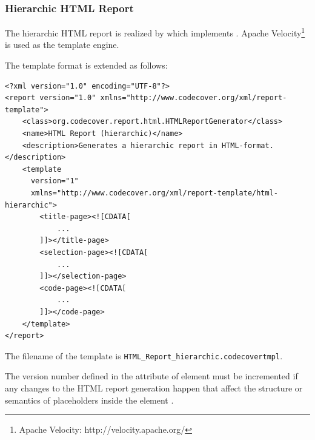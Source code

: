 \subsubsection{Hierarchic HTML Report} \label{Classes:Report:HTMLReport}

The hierarchic HTML report is realized by  which implements . Apache Velocity\footnote{Apache Velocity: http://velocity.apache.org/} is used as the template engine.

The template format is extended as follows:
\begin{verbatim}
<?xml version="1.0" encoding="UTF-8"?>
<report version="1.0" xmlns="http://www.codecover.org/xml/report-template">
    <class>org.codecover.report.html.HTMLReportGenerator</class>
    <name>HTML Report (hierarchic)</name>
    <description>Generates a hierarchic report in HTML-format.</description>
    <template
      version="1"
      xmlns="http://www.codecover.org/xml/report-template/html-hierarchic">
        <title-page><![CDATA[
            ...
        ]]></title-page>
        <selection-page><![CDATA[
            ...
        ]]></selection-page>
        <code-page><![CDATA[
            ...
        ]]></code-page>
    </template>
</report>
\end{verbatim}
The filename of the template is \texttt{HTML\_Report\_hierarchic.codecovertmpl}.

The version number defined in the attribute  of element  must be incremented if any changes to the HTML report generation happen that affect the structure or semantics of placeholders inside the element .

